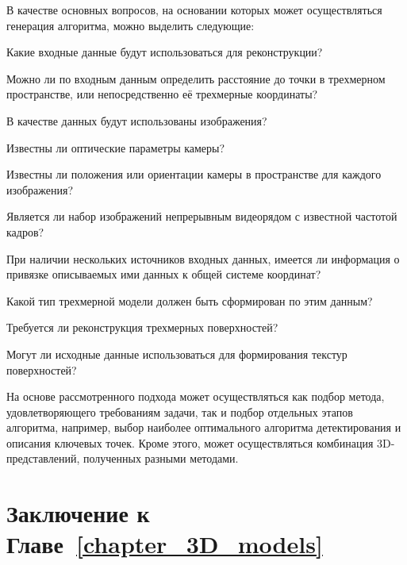 В качестве основных вопросов, на основании которых может осуществляться генерация алгоритма, можно выделить следующие:
\begin{textitemize}
    \item Какие входные данные будут использоваться для реконструкции?
    \begin{textitemize}
        \item Можно ли по входным данным определить расстояние до точки в трехмерном пространстве, или непосредственно её трехмерные координаты?
        \item В качестве данных будут использованы изображения?
        \begin{textitemize}
            \item Известны ли оптические параметры камеры?
            \item Известны ли положения или ориентации камеры в пространстве для каждого изображения?
            \item Является ли набор изображений непрерывным видеорядом с известной частотой кадров?
        \end{textitemize}
        \item При наличии нескольких источников входных данных, имеется ли информация о привязке описываемых ими данных к общей системе координат?
    \end{textitemize}
    \item Какой тип трехмерной модели должен быть сформирован по этим данным?
    \begin{textitemize}
        \item Требуется ли реконструкция трехмерных поверхностей?
        \begin{textitemize}
            \item Могут ли исходные данные использоваться для формирования текстур поверхностей?
        \end{textitemize}
    \end{textitemize}
\end{textitemize}

На основе рассмотренного подхода может осуществляться как подбор метода, удовлетворяющего требованиям задачи, так и подбор отдельных этапов алгоритма, например, выбор наиболее оптимального алгоритма детектирования и описания ключевых точек.
Кроме этого, может осуществляться комбинация 3D-представлений, полученных разными методами.

\section*{Заключение к Главе~\ref{chapter_3D_models}}

